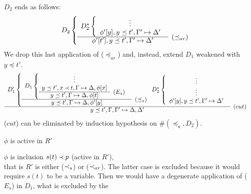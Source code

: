 \begin{PROOF}
\begin{LS}
\begin{LSA}
\begin{LSB}
$D_2$ ends as follows:
\[ D_2 \left \{ \begin{array}{cl}
 D_2^* \left \{ \begin{array}{cl}
 \vdots \\
 \phi'[y], y\preceq t', \Gamma'\Seq\Delta' \end{array} \right . \\ \cline{1-1}
 \phi'[t'], y\preceq t', \Gamma'\Seq\Delta' & \rabove{(\preceq_{ar})}
 \end{array} \right . \]
We drop this last application of ($\preceq_{ar}$) and, instead, extend $D_1$
weakened with $y\preceq t'$. %
%
{ \scriptsize 
\[\begin{array}{cl}
D_1' \left \{ \begin{array}{cl}
D_1 \left \{ \begin{array}{cl}
  \vdots \\ 
  y\preceq t', x\Incl t,\Gamma\Seq\Delta, \phi[x]  \\ \cline{1-1}
y\preceq t', \Gamma\Seq\Delta, \phi[t]  & \raisebox{1.2ex}[1.5ex][0ex]{($E_s$)}
 \end{array} \right . \\ \cline{1-1}
y\preceq t', \Gamma\Seq\Delta, \phi'[y] &
\raisebox{1.2ex}[1.5ex][0ex]{($\preceq_s$)}
 \end{array} \right .
%
 D_2^*\left\{ \begin{array}{cl}
 \vdots \\
\vdots \\
\phi'[y], y\preceq t', \Gamma'\Seq\Delta' \end{array} \right .
 \\ \cline{1-1}
y\preceq t', \Gamma,\Gamma' \Seq \Delta,\Delta' &   \raisebox{1.2ex}[1.5ex][0ex]{($cut$)}
\end{array} \] }
($cut$) can be eliminated by induction hypothesis on $\#(\preceq_a,D_2)$.
%
%
\end{LSB}
%
%
%
\item\label{it:cutactive} %
 $\phi$ is active in $R'$
\begin{LSB}
\item\label{it:inact} $\phi$ is inclusion $s(t)\mathbin{\prec} p$ (active in $R'$),
\\
that is $R'$ is either ($\mathbin{\prec}_s$) or ($\mathbin{\prec}_{ar}$).
The latter case is excluded because it would require $s(t)$ to be a variable.
Then we would have a degenerate application of ($E_s$) in $D_1$, what is excluded by the

\end{LSB}
\end{LSA}
\end{LS}
\end{PROOF}

